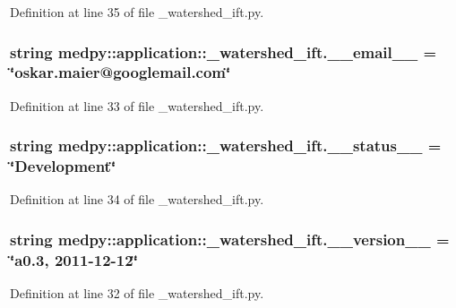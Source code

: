 Definition at line 35 of file \_\-watershed\_\-ift.py.

\hypertarget{namespacemedpy_1_1application_1_1__watershed__ift_a473ec907b408497d2197d386eec5ca68}{
\subsubsection[{\_\-\_\-email\_\-\_\-}]{\setlength{\rightskip}{0pt plus 5cm}string {\bf medpy::application::\_\-watershed\_\-ift.\_\-\_\-email\_\-\_\-} = \char`\"{}oskar.maier@googlemail.com\char`\"{}}}
\label{namespacemedpy_1_1application_1_1__watershed__ift_a473ec907b408497d2197d386eec5ca68}


Definition at line 33 of file \_\-watershed\_\-ift.py.

\hypertarget{namespacemedpy_1_1application_1_1__watershed__ift_aa2d2710b9034a91e55d264eb5a14fbe3}{
\subsubsection[{\_\-\_\-status\_\-\_\-}]{\setlength{\rightskip}{0pt plus 5cm}string {\bf medpy::application::\_\-watershed\_\-ift.\_\-\_\-status\_\-\_\-} = \char`\"{}Development\char`\"{}}}
\label{namespacemedpy_1_1application_1_1__watershed__ift_aa2d2710b9034a91e55d264eb5a14fbe3}


Definition at line 34 of file \_\-watershed\_\-ift.py.

\hypertarget{namespacemedpy_1_1application_1_1__watershed__ift_a08a416eb506e787245d380d9d5cf20cd}{
\subsubsection[{\_\-\_\-version\_\-\_\-}]{\setlength{\rightskip}{0pt plus 5cm}string {\bf medpy::application::\_\-watershed\_\-ift.\_\-\_\-version\_\-\_\-} = \char`\"{}a0.3, 2011-\/12-\/12\char`\"{}}}
\label{namespacemedpy_1_1application_1_1__watershed__ift_a08a416eb506e787245d380d9d5cf20cd}


Definition at line 32 of file \_\-watershed\_\-ift.py.

